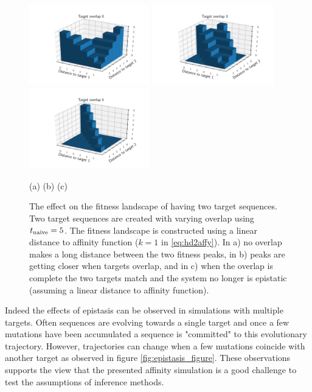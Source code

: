 \begin{figure}[!ht]
\begin{center}
\includegraphics[height=35mm]{figures/fitness_overlap0.pdf}
\includegraphics[height=35mm]{figures/fitness_overlap3.pdf}
\includegraphics[height=35mm]{figures/fitness_overlap5.pdf} \newline%
\end{center}
\vspace{-6mm} \hspace{26mm} (a) \hspace{39mm} (b) \hspace{39mm} (c)
    \caption{
    \label{fig:epistasis}
        The effect on the fitness landscape of having two target sequences.
        Two target sequences are created with varying overlap using $t_{\text{naive}}=5$.
        The fitness landscape is constructed using a linear distance to affinity function ($k=1$ in \eqref{eq:hd2affy}).
        In a) no overlap makes a long distance between the two fitness peaks, in b) peaks are getting closer when targets overlap, and in c) when the overlap is complete the two targets match and the system no longer is epistatic (assuming a linear distance to affinity function).
        }
\end{figure}


Indeed the effects of epistasis can be observed in simulations with multiple targets.
Often sequences are evolving towards a single target and once a few mutations have been accumulated a sequence is "committed" to this evolutionary trajectory.
However, trajectories can change when a few mutations coincide with another target as observed in figure \ref{fig:epistasis_figure}.
These observations supports the view that the presented affinity simulation is a good challenge to test the assumptions of inference methods.

